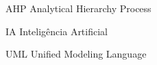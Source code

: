\begin{siglas} %
	
	
	
	
	
	
	
	
	
	
	
	\item[AHP] Analytical Hierarchy Process
	
	
	
	
	
	
	
	
	\item[IA] Inteligência Artificial
	
	
	
	
	
	
	
	
	
	
	
	
	\item[UML] Unified Modeling Language
	
	
	
	
	

\end{siglas}


